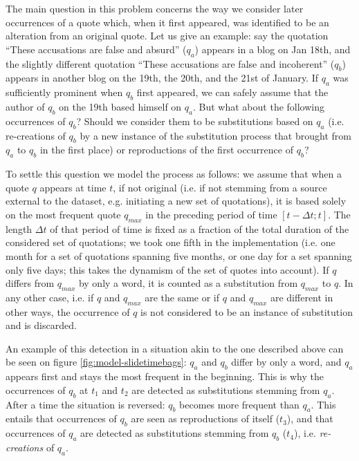 The main question in this problem concerns the way we consider later occurrences of a quote which, when it first appeared, was identified to be an alteration from an original quote. Let us give an example: say the quotation ``These accusations are false and absurd'' ($q_a$) appears in a blog on Jan 18th, and the slightly different quotation ``These accusations are false and incoherent'' ($q_b$) appears in another blog on the 19th, the 20th, and the 21st of January. If $q_a$ was sufficiently prominent when $q_b$ first appeared, we can safely assume that the author of $q_b$ on the 19th based himself on $q_a$. But what about the following occurrences of $q_b$? Should we consider them to be substitutions based on $q_a$ (i.e. re-creations of $q_b$ by a new instance of the substitution process that brought from $q_a$ to $q_b$ in the first place) or reproductions of the first occurrence of $q_b$?

To settle this question we model the process as follows: we assume that when a quote $q$ appears at time $t$, if not original (i.e. if not stemming from a source external to the dataset, e.g. initiating a new set of quotations), it is based solely on the most frequent quote $q_{max}$ in the preceding period of time $[t - \Delta t ; t]$. The length $\Delta t$ of that period of time is fixed as a fraction of the total duration of the considered set of quotations; we took one fifth in the implementation (i.e. one month for a set of quotations spanning five months, or one day for a set spanning only five days; this takes the dynamism of the set of quotes into account). If $q$ differs from $q_{max}$ by only a word, it is counted as a substitution from $q_{max}$ to $q$. In any other case, i.e. if $q$ and $q_{max}$ are the same or if $q$ and $q_{max}$ are different in other ways, the occurrence of $q$ is not considered to be an instance of substitution and is discarded.

An example of this detection in a situation akin to the one described above can be seen on figure \ref{fig:model-slidetimebags}: $q_a$ and $q_b$ differ by only a word, and $q_a$ appears first and stays the most frequent in the beginning. This is why the occurrences of $q_b$ at $t_1$ and $t_2$ are detected as substitutions stemming from $q_a$. After a time the situation is reversed: $q_b$ becomes more frequent than $q_a$. This entails that occurrences of $q_b$ are seen as reproductions of itself ($t_3$), and that occurrences of $q_a$ are detected as substitutions stemming from $q_b$ ($t_4$), i.e. \emph{re-creations} of $q_a$.


